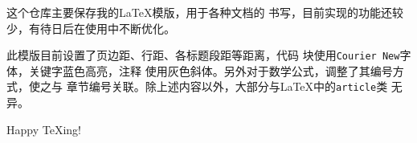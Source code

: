这个仓库主要保存我的\LaTeX 模版，用于各种文档的
书写，目前实现的功能还较少，有待日后在使用中不断优化。

此模版目前设置了页边距、行距、各标题段距等距离，代码
块使用\texttt{Courier New}字体，关键字蓝色高亮，注释
使用灰色斜体。另外对于数学公式，调整了其编号方式，使之与
章节编号关联。除上述内容以外，大部分与\LaTeX 中的\texttt{article}类
无异。

Happy \TeX ing!